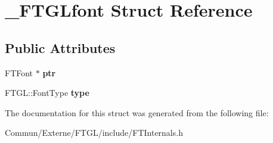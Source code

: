 \hypertarget{struct___f_t_g_lfont}{}\section{\+\_\+\+F\+T\+G\+Lfont Struct Reference}
\label{struct___f_t_g_lfont}
\subsection*{Public Attributes}
\begin{DoxyCompactItemize}
\item 
F\+T\+Font $\ast$ {\bfseries ptr}\hypertarget{struct___f_t_g_lfont_a8bc834719ce209cd1ecc385b75e363b2}{}\label{struct___f_t_g_lfont_a8bc834719ce209cd1ecc385b75e363b2}

\item 
F\+T\+G\+L\+::\+Font\+Type {\bfseries type}\hypertarget{struct___f_t_g_lfont_a1809096d837d4099e0470aa83a061ada}{}\label{struct___f_t_g_lfont_a1809096d837d4099e0470aa83a061ada}

\end{DoxyCompactItemize}


The documentation for this struct was generated from the following file\+:\begin{DoxyCompactItemize}
\item 
Commun/\+Externe/\+F\+T\+G\+L/include/F\+T\+Internals.\+h\end{DoxyCompactItemize}
